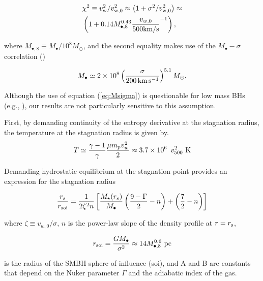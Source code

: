 \documentclass[usenatbib,fleqn]{mn2e}
\newcommand{\rs}{r_s}
\newcommand{\Mstar}{M_{\star}}
\newcommand{\Mbh}[1][]{M_{\bullet#1}}
\newcommand{\Mbheight}{M_{\bullet,8}}
\newcommand{\soi}{\rm soi}
\newcommand{\rsoi}{r_{\soi}}
\newcommand{\vwO}{v_{w,0}}
\begin{document}
 \begin{align}
&\chi^2 \equiv v_{\rm w}^{2}/v_{\rm w,0}^{2} \approx \left(1 +
  \sigma^{2}/v_{\rm w,0}^{2}\right) \approx \\
&\left(1+0.14 \Mbheight^{0.43}\frac{\vwO}{500 {\rm km/s}}^{-1}\right), 
\end{align}

where $M_{\bullet,8} \equiv M_{\bullet}/10^{8}M_{\odot}$, and the
second equality makes use of the $M_{\bullet}-\sigma$ correlation
(\citealt{Gultekin+09})

 \begin{align}
M_{\bullet} \simeq 2\times 10^{8}\left(\frac{\sigma}{200\,{\rm
      km\,s^{-1}}}\right)^{5.1}M_{\odot}.
\label{eq:Msigma}
\end{align}

Although the use of equation (\ref{eq:Msigma}) is questionable for low mass BHs (e.g., \citealt{Greene&Ho07}), our results are not particularly sensitive to this assumption.  

First, by demanding continuity of the entropy derivative at the stagnation radius, the temperature at the stagnation radius is given by.
\begin{align}
T \simeq \frac{\gamma-1}{\gamma}\frac{\mu m_p v_{w}^{2}}{2} \approx 3.7
\times 10^6\ \, v_{500}^2 \,\,{\rm K} 
\label{eq:Tanalytic}
\end{align}

Demanding hydrostatic equilibrium at the stagnation point provides an
expression for the stagnation radius

\begin{align}
  \frac{\rs}{\rsoi}=\frac{1}{2 \zeta^2 n}\left[
   \frac{\Mstar(\rs)}{\Mbh}\left(\frac{9-\Gamma}{2}-n\right)+\left(\frac{7}{2}-n\right)\right]
 \label{eq:stag_analytic}
\end{align}


where $\zeta \equiv v_{w,0}/\sigma$, $n$ is the power-law slope of the
density profile at $r = r_{\rm s}$,

\begin{align}
r_{\rm soi} = \frac{GM_{\bullet}}{\sigma^{2}} \approx 14M_{\bullet,8}^{0.6}\,\,{\rm pc}
\end{align}

is the radius of the SMBH sphere of
influence (soi), and A and B are constants that depend on the Nuker
parameter $\Gamma$ and the adiabatic index of the gas.
\end{document}
